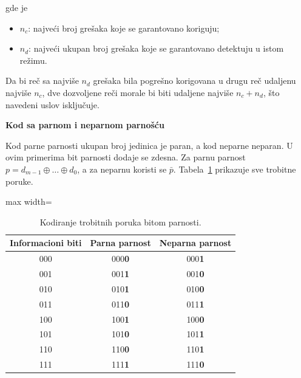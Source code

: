 \documentclass[a4paper,11pt]{article}
\numberwithin{equation}{section}
\newcommand{\redlinija}{\arrayrulecolor{black!28}\specialrule{0.3pt}{2pt}{2pt}\arrayrulecolor{black}}
\newcommand{\istaknutbit}[1]{\textcolor{Primary!85!black}{\ifmmode\mathbf{#1}\else\textbf{#1}\fi}}
\begin{document}
gde je



\begin{itemize}[leftmargin=*]
\item $n_c$: najveći broj grešaka koje se garantovano koriguju;
\item $n_d$: najveći ukupan broj grešaka koje se garantovano detektuju u istom režimu.
\end{itemize}
Da bi reč sa najviše $n_d$ grešaka bila pogrešno korigovana u drugu reč udaljenu najviše $n_c$, dve dozvoljene reči morale bi biti udaljene najviše $n_c+n_d$, što navedeni uslov isključuje.

\textbf{Kod sa parnom i neparnom parnošću}



Kod parne parnosti ukupan broj jedinica je paran, a kod neparne neparan. U ovim primerima bit parnosti dodaje se zdesna. Za parnu parnost $p=d_{m-1}\oplus\dots\oplus d_0$, a za neparnu koristi se $\bar p$. Tabela~\ref{tab:parity3} prikazuje sve trobitne poruke.


\begin{table}[!htbp]\centering\caption{Kodiranje trobitnih poruka bitom parnosti.}\label{tab:parity3}
\begin{adjustbox}{max width=\linewidth}\begin{tabular}{ccc}\toprule
Informacioni biti & Parna parnost & Neparna parnost\\\midrule
000 & 000\istaknutbit{0} & 000\istaknutbit{1}\\
\redlinija
001 & 001\istaknutbit{1} & 001\istaknutbit{0}\\
\redlinija
010 & 010\istaknutbit{1} & 010\istaknutbit{0}\\
\redlinija
011 & 011\istaknutbit{0} & 011\istaknutbit{1}\\
\redlinija
100 & 100\istaknutbit{1} & 100\istaknutbit{0}\\
\redlinija
101 & 101\istaknutbit{0} & 101\istaknutbit{1}\\
\redlinija
110 & 110\istaknutbit{0} & 110\istaknutbit{1}\\
\redlinija
111 & 111\istaknutbit{1} & 111\istaknutbit{0}\\
\bottomrule\end{tabular}\end{adjustbox}
\end{table}
\end{document}
